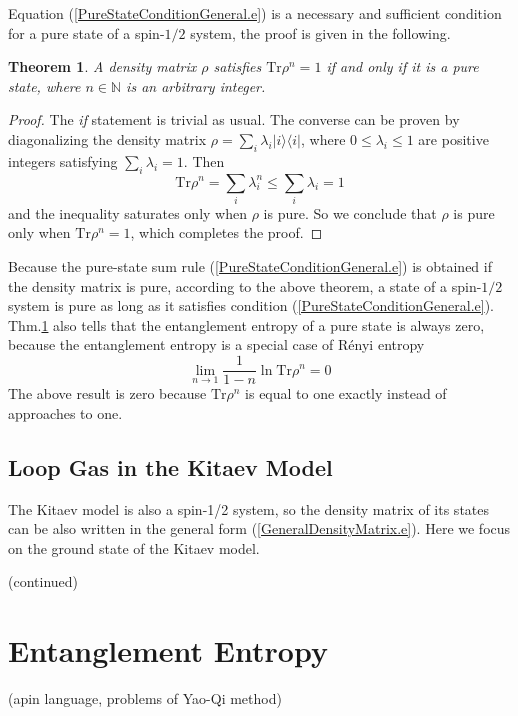 \documentclass[12font]{article}
\newtheorem{theorem}{Theorem}[section]
\theoremstyle{definition}
\numberwithin{equation}{section}
\newcommand{\bra}[1]{\langle #1 |}
\newcommand{\ket}[1]{| #1 \rangle}
\newcommand{\mrm}[1]{\mathrm{#1}}
\newcommand{\alert}[1]{{\color{red}#1}}
\newcommand{\Tr}{\mrm{Tr}}
\begin{document}
Equation (\ref{PureStateConditionGeneral.e}) is a necessary and sufficient condition for a pure state of a spin-$1/2$ system, the proof is given in the following.

\begin{theorem}\label{generalncondition.thm}
  A density matrix $\rho$ satisfies $\Tr\rho^n = 1$ if and only if it is a pure state, where $n\in\mathbb{N}$ is an arbitrary integer.
\end{theorem}
\begin{proof}
  The \emph{if} statement is trivial as usual. The converse can be proven by diagonalizing the density matrix $\rho = \sum_{i}\lambda_i\ket{i}\bra{i}$,  where $0\leq\lambda_i\leq 1$ are positive integers satisfying $\sum_i\lambda_i = 1$. Then
  \[
  \Tr\rho^n = \sum_{i}\lambda_i^n \leq \sum_{i}\lambda_i = 1
  \]
  and the inequality saturates only when $\rho$ is pure. So we conclude that $\rho$ is pure only when $\Tr\rho^n = 1$, which completes the proof.
\end{proof}
Because the pure-state sum rule (\ref{PureStateConditionGeneral.e}) is obtained if the density matrix is pure, according to the above theorem, a state of a spin-$1/2$ system is pure as long as it satisfies condition (\ref{PureStateConditionGeneral.e}). Thm.\ref{generalncondition.thm} also tells that the entanglement entropy of a pure state is always zero, because the entanglement entropy is a special case of R\'enyi entropy \[
\lim_{n\to 1}\frac{1}{1-n}\ln\Tr\rho^n = 0
\]
The above result is zero because $\Tr\rho^n$ is equal to one exactly instead of approaches to one.





\subsection{Loop Gas in the Kitaev Model}
The Kitaev model is also a spin-1/2 system, so the density matrix of its states can be also written in the general form (\ref{GeneralDensityMatrix.e}). Here we focus on the ground state of the Kitaev model.

\alert{(continued)}

\section{Entanglement Entropy}
\alert{(apin language, problems of Yao-Qi method)}
\end{document}
